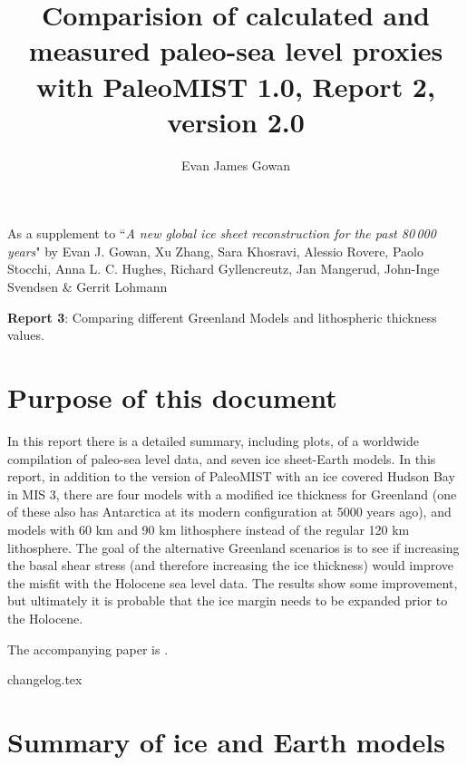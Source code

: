 \documentclass[a4paper,12pt]{article}
\begin{document}
\title{Comparision of calculated and measured paleo-sea level proxies with PaleoMIST 1.0, Report 2, version 2.0}

\author{Evan James Gowan}
    
\date{}

\maketitle

\normalsize As a supplement to ``\emph{A new global ice sheet reconstruction for the past 80\,000 years}" by Evan J. Gowan, Xu Zhang, Sara Khosravi, Alessio Rovere, Paolo Stocchi, Anna L. C. Hughes, Richard Gyllencreutz, Jan Mangerud, John-Inge Svendsen \& Gerrit Lohmann

\textbf{Report 3}: Comparing different Greenland Models and lithospheric thickness values.

\newpage

\tableofcontents

\newpage



\section{Purpose of this document}

In this report there is a detailed summary, including plots, of a worldwide compilation of paleo-sea level data, and seven ice sheet-Earth models. In this report, in addition to the version of PaleoMIST with an ice covered Hudson Bay in MIS 3, there are four models with a modified ice thickness for Greenland (one of these also has Antarctica at its modern configuration at 5000 years ago), and models with 60 km and 90 km lithosphere instead of the regular 120 km lithosphere. The goal of the alternative Greenland scenarios is to see if increasing the basal shear stress (and therefore increasing the ice thickness) would improve the misfit with the Holocene sea level data. The results show some improvement, but ultimately it is probable that the ice margin needs to be expanded prior to the Holocene.

The accompanying paper is \citet{GowanEtal2021b}.


{changelog.tex}

\section{Summary of ice and Earth models}
\end{document}
